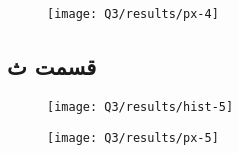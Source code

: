 \documentclass[12pt,onecolumn,a4paper]{article}
\theoremstyle{definition}
\begin{document}
		
	\begin{figure}[H]
		\centering
		\texttt{[image: Q3/results/px-4]}
		\caption{}
		\label{fig:px-4}
	\end{figure}

	
	\FloatBarrier
	\subsection{قسمت ث}

		
	\begin{figure}[H]
		\centering
		\texttt{[image: Q3/results/hist-5]}
		\caption{}
		\label{fig:hist-5}
	\end{figure}


		
	\begin{figure}[H]
		\centering
		\texttt{[image: Q3/results/px-5]}
		\caption{}
		\label{fig:px-5}
	\end{figure}
	
	\newpage
	
	
	
	
\end{document}
